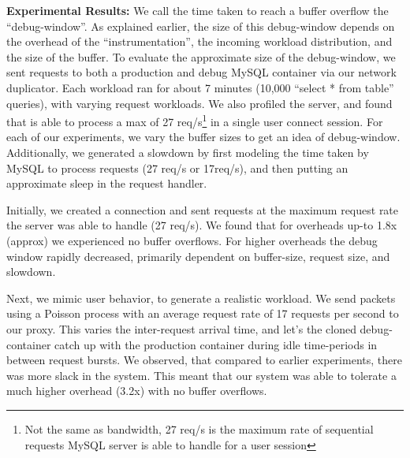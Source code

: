 \noindent
\textbf{Experimental Results:} We call the time taken to reach a buffer overflow the ``debug-window''.
As explained earlier, the size of this debug-window depends on the overhead of the ``instrumentation'', the incoming workload distribution, and the size of the buffer.
To evaluate the approximate size of the debug-window, we sent requests to both a production and debug MySQL container via our network duplicator.
Each workload ran for about 7 minutes (10,000 ``select * from table'' queries), with varying request workloads.
We also profiled the server, and found that is able to process a max of 27 req/s\footnote{Not the same as bandwidth, 27 req/s is the maximum rate of sequential requests MySQL server is able to handle for a user session} in a single user connect session. 
For each of our experiments, we vary the buffer sizes to get an idea of debug-window. 
Additionally, we generated a slowdown by first modeling the time taken by MySQL to process requests (27 req/s or 17req/s), and then putting an approximate sleep in the request handler.

Initially, we created a connection and sent requests at the maximum request rate the server was able to handle (27 req/s).
We found that for overheads up-to 1.8x (approx) we experienced no buffer overflows.
For higher overheads the debug window rapidly decreased, primarily dependent on buffer-size, request size, and slowdown.

Next, we mimic user behavior, to generate a realistic workload.
We send packets using a Poisson process with an average request rate of 17 requests per second to our proxy. 
This varies the inter-request arrival time, and let's the cloned debug-container catch up with the production container during idle time-periods in between request bursts.
We observed, that compared to earlier experiments, there was more slack in the system. 
This meant that our system was able to tolerate a much higher overhead (3.2x) with no buffer overflows.



